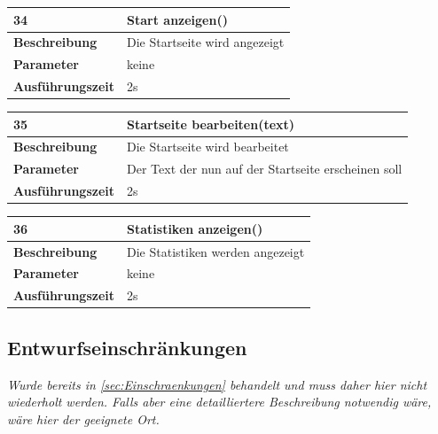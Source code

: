 \documentclass[fontsize=12pt,paper=a4,twoside]{scrartcl}
\begin{document}
  \begin{table}[htbp]
  \label{a34}
  \begin{tabular}{|l|p{10cm}|}
  \hline 
  \textbf{34} & \textbf{Start anzeigen()} \\ \hline
  \textbf{Beschreibung} & Die Startseite wird angezeigt\\ \hline
  \textbf{Parameter} & keine \\ \hline
  \textbf{Ausführungszeit} & 2s\\ \hline
  \end{tabular}
  \end{table}

  \begin{table}[htbp]
  \label{a35}
  \begin{tabular}{|l|p{10cm}|}
  \hline 
  \textbf{35} & \textbf{Startseite bearbeiten(text)} \\ \hline
  \textbf{Beschreibung} & Die Startseite wird bearbeitet\\ \hline
  \textbf{Parameter} & Der Text der nun auf der Startseite erscheinen soll \\ \hline
  \textbf{Ausführungszeit} & 2s\\ \hline
  \end{tabular}
  \end{table}

  \begin{table}[htbp]
  \label{a36}
  \begin{tabular}{|l|p{10cm}|}
  \hline 
  \textbf{36} & \textbf{Statistiken anzeigen()} \\ \hline
  \textbf{Beschreibung} & Die Statistiken werden angezeigt\\ \hline
  \textbf{Parameter} & keine \\ \hline
  \textbf{Ausführungszeit} & 2s\\ \hline
  \end{tabular}
  \end{table}
  
\subsection{Entwurfseinschränkungen}


{\em Wurde bereits in \ref{sec:Einschraenkungen} behandelt und muss
  daher hier nicht wiederholt werden. Falls aber eine detailliertere
  Beschreibung notwendig wäre, wäre hier der geeignete Ort.}
  
\end{document}
